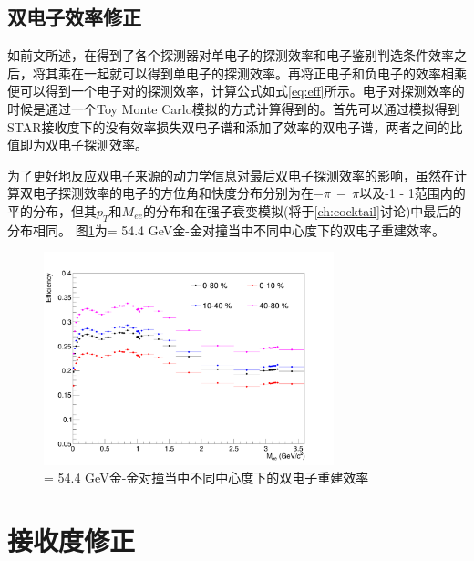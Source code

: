 \subsection{双电子效率修正}
\label{chap:pair_eff}

如前文所述，在得到了各个探测器对单电子的探测效率和电子鉴别判选条件效率之后，将其乘在一起就可以得到单电子的探测效率。再将正电子和负电子的效率相乘便可以得到一个电子对的探测效率，计算公式如式\ref{eq:eff}所示。电子对探测效率的时候是通过一个Toy Monte Carlo模拟的方式计算得到的。首先可以通过模拟得到STAR接收度下的没有效率损失双电子谱和添加了效率的双电子谱，两者之间的比值即为双电子探测效率。

为了更好地反应双电子来源的动力学信息对最后双电子探测效率的影响，虽然在计算双电子探测效率的电子的方位角和快度分布分别为在$-\pi~-~\pi$以及-1 - 1范围内的平的分布，但其$p_T$和$M_{ee}$的分布和在强子衰变模拟(将于\ref{ch:cocktail}讨论)中最后的分布相同。
图\ref{fig:Compare_PairEff}为\sNN = 54.4 GeV金-金对撞当中不同中心度下的双电子重建效率。

\begin{figure}[htb]
    \begin{center}
    \includegraphics[width=0.75\textwidth,clip]{figures/Chapter4/Compare_PairEff.png}
    \end{center}
    \caption[不同中心度下的双电子重建效率]{\sNN = 54.4 GeV金-金对撞当中不同中心度下的双电子重建效率}
    \label{fig:Compare_PairEff}
\end{figure}

\section{接收度修正}
\label{chap:pair_acc}

